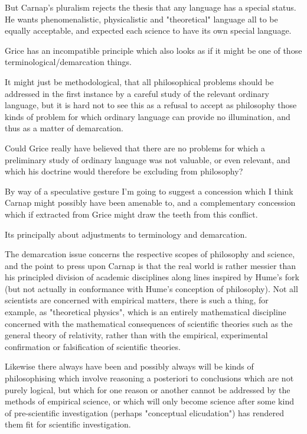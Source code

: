 \documentclass[10pt,titlepage]{book}
\begin{document}
But Carnap's pluralism rejects the thesis that any language has a special status. He wants phenomenalistic, physicalistic and "theoretical" language all to be equally acceptable, and expected each science to have its own special language.

Grice has an incompatible principle which also looks as if it might be one of those terminological/demarcation things.

It might just be methodological, that all philosophical problems should be addressed in the first instance by a careful study of the relevant ordinary language, but it is hard not to see this as a refusal to accept as philosophy those kinds of problem for which ordinary language can provide no illumination, and thus as a matter of demarcation.

Could Grice really have believed that there are no problems for which a preliminary study of ordinary language was not valuable, or even relevant, and which his doctrine would therefore be excluding from philosophy?

By way of a speculative gesture I'm going to suggest a concession which I think Carnap might possibly have been amenable to, and a complementary concession which if extracted from Grice might draw the teeth from this conflict.

Its principally about adjustments to terminology and demarcation.

The demarcation issue concerns the respective scopes of philosophy and science, and the point to press upon Carnap is that the real world is rather messier than his principled division of academic disciplines along lines inspired by Hume's fork (but not actually in conformance with Hume's conception of philosophy).  Not all scientists are concerned with empirical matters, there is such a thing, for example, as "theoretical physics", which is an entirely mathematical discipline concerned with the mathematical consequences of scientific theories such as the general theory of relativity, rather than with the empirical, experimental confirmation or falsification of scientific theories.

Likewise there always have been and possibly always will be kinds of philosophising which involve reasoning a posteriori to conclusions which are not purely logical, but which for one reason or another cannot be addressed by the methods of empirical science, or which will only become science after some kind of pre-scientific investigation (perhaps "conceptual elicudation") has rendered them fit for scientific investigation.
\end{document}
